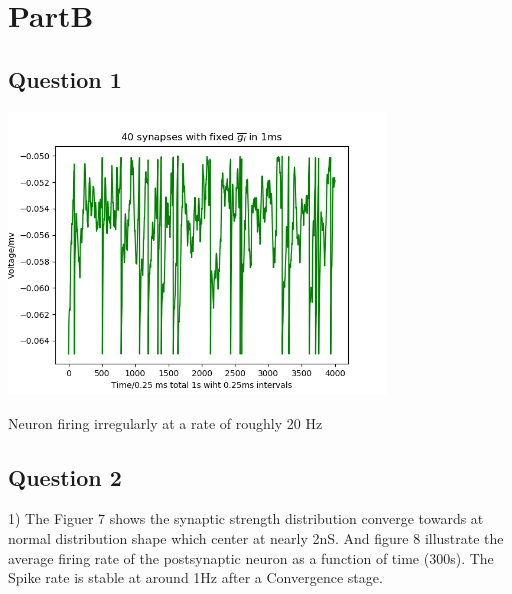 \documentclass[fleqn,11pt]{article}
\begin{document}
\newpage

\section*{PartB}
\subsection*{Question 1}
  \begin{center} 
    \includegraphics[width=10cm]{graphs/PartB_Question1.png}
  \end{center}
\par Neuron firing irregularly at a rate of roughly 20 Hz

\subsection*{Question 2}
\par 1) The Figuer 7 shows the synaptic strength distribution converge towards 
at normal distribution shape which center at nearly 2nS. And figure 8 illustrate
the average firing rate of the postsynaptic neuron as a function of time (300s).
The Spike rate is stable at around 1Hz after a Convergence stage.
\end{document}

